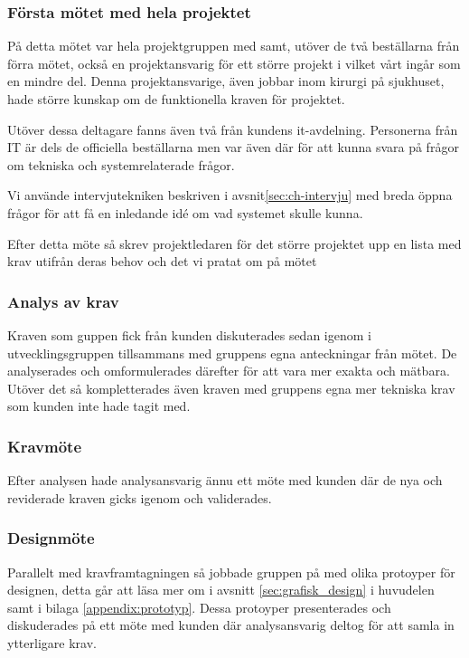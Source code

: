 \subsubsection{Första mötet med hela projektet}
På detta mötet var hela projektgruppen med samt, utöver de två beställarna från förra mötet, också en projektansvarig för ett större projekt i vilket vårt ingår som en mindre del. Denna projektansvarige, även jobbar inom kirurgi på sjukhuset, hade större kunskap om de funktionella kraven för projektet.

Utöver dessa deltagare fanns även två från kundens it-avdelning. Personerna från IT är dels de officiella beställarna men var även där för att kunna svara på frågor om tekniska och systemrelaterade frågor.

Vi använde intervjutekniken beskriven i avsnit\ref{sec:ch-intervju} med breda öppna frågor för att få en inledande idé om vad systemet skulle kunna. 

Efter detta möte så skrev projektledaren för det större projektet upp en lista med krav utifrån deras behov och det vi pratat om på mötet

\subsubsection{Analys av krav}
Kraven som guppen fick från kunden diskuterades sedan igenom i utvecklingsgruppen tillsammans med gruppens egna anteckningar från mötet. De analyserades och omformulerades därefter för att vara mer exakta och mätbara. Utöver det så kompletterades även kraven med gruppens egna mer tekniska krav som kunden inte hade tagit med.

\subsubsection{Kravmöte}
Efter analysen hade analysansvarig ännu ett möte med kunden där de nya och reviderade kraven gicks igenom och validerades.

\subsubsection{Designmöte}
Parallelt med kravframtagningen så jobbade gruppen på med olika protoyper för designen, detta går att läsa mer om i avsnitt \ref{sec:grafisk_design} i huvudelen samt i bilaga \ref{appendix:prototyp}.
Dessa protoyper presenterades och diskuderades på ett möte med kunden där analysansvarig deltog för att samla in ytterligare krav.

